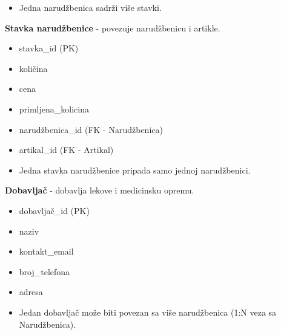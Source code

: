 \begin{itemize}{Veze:}
    \item Jedna narudžbenica sadrži više stavki.
\end{itemize}

\indent\textbf{Stavka narudžbenice} - povezuje narudžbenicu i artikle.
\begin{itemize}{Atributi:}
    \item stavka\_id (PK)
    \item količina
    \item cena
    \item primljena\_kolicina
    \item narudžbenica\_id (FK - Narudžbenica)
    \item artikal\_id (FK - Artikal)
\end{itemize}

\begin{itemize}{Veze:}
    \item Jedna stavka narudžbenice pripada samo jednoj narudžbenici. 
\end{itemize}

\indent \textbf{Dobavljač} - dobavlja lekove i medicinsku opremu.
\begin{itemize}{Atributi:}
    \item dobavljač\_id (PK)
    \item naziv
    \item kontakt\_email
    \item broj\_telefona 
    \item adresa
\end{itemize}

\begin{itemize}{Veze:}
    \item Jedan dobavljač može biti povezan sa više narudžbenica (1:N veza sa Narudžbenica).
\end{itemize}

